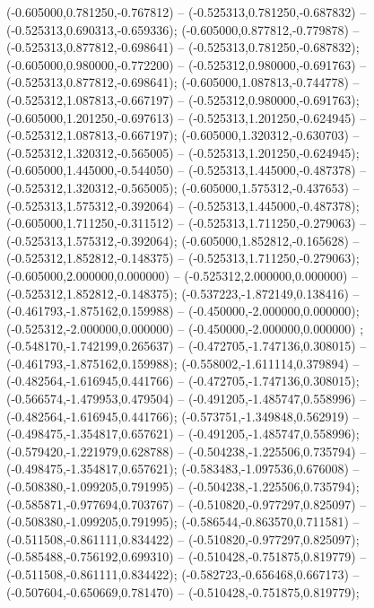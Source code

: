  (-0.605000,0.781250,-0.767812) -- (-0.525313,0.781250,-0.687832) -- (-0.525313,0.690313,-0.659336);
 (-0.605000,0.877812,-0.779878) -- (-0.525313,0.877812,-0.698641) -- (-0.525313,0.781250,-0.687832);
 (-0.605000,0.980000,-0.772200) -- (-0.525312,0.980000,-0.691763) -- (-0.525313,0.877812,-0.698641);
 (-0.605000,1.087813,-0.744778) -- (-0.525312,1.087813,-0.667197) -- (-0.525312,0.980000,-0.691763);
 (-0.605000,1.201250,-0.697613) -- (-0.525313,1.201250,-0.624945) -- (-0.525312,1.087813,-0.667197);
 (-0.605000,1.320312,-0.630703) -- (-0.525312,1.320312,-0.565005) -- (-0.525313,1.201250,-0.624945);
 (-0.605000,1.445000,-0.544050) -- (-0.525313,1.445000,-0.487378) -- (-0.525312,1.320312,-0.565005);
 (-0.605000,1.575312,-0.437653) -- (-0.525313,1.575312,-0.392064) -- (-0.525313,1.445000,-0.487378);
 (-0.605000,1.711250,-0.311512) -- (-0.525313,1.711250,-0.279063) -- (-0.525313,1.575312,-0.392064);
 (-0.605000,1.852812,-0.165628) -- (-0.525312,1.852812,-0.148375) -- (-0.525313,1.711250,-0.279063);
 (-0.605000,2.000000,0.000000) -- (-0.525312,2.000000,0.000000) -- (-0.525312,1.852812,-0.148375);
 (-0.537223,-1.872149,0.138416) -- (-0.461793,-1.875162,0.159988) -- (-0.450000,-2.000000,0.000000);
 (-0.525312,-2.000000,0.000000) -- (-0.450000,-2.000000,0.000000) ;
 (-0.548170,-1.742199,0.265637) -- (-0.472705,-1.747136,0.308015) -- (-0.461793,-1.875162,0.159988);
 (-0.558002,-1.611114,0.379894) -- (-0.482564,-1.616945,0.441766) -- (-0.472705,-1.747136,0.308015);
 (-0.566574,-1.479953,0.479504) -- (-0.491205,-1.485747,0.558996) -- (-0.482564,-1.616945,0.441766);
 (-0.573751,-1.349848,0.562919) -- (-0.498475,-1.354817,0.657621) -- (-0.491205,-1.485747,0.558996);
 (-0.579420,-1.221979,0.628788) -- (-0.504238,-1.225506,0.735794) -- (-0.498475,-1.354817,0.657621);
 (-0.583483,-1.097536,0.676008) -- (-0.508380,-1.099205,0.791995) -- (-0.504238,-1.225506,0.735794);
 (-0.585871,-0.977694,0.703767) -- (-0.510820,-0.977297,0.825097) -- (-0.508380,-1.099205,0.791995);
 (-0.586544,-0.863570,0.711581) -- (-0.511508,-0.861111,0.834422) -- (-0.510820,-0.977297,0.825097);
 (-0.585488,-0.756192,0.699310) -- (-0.510428,-0.751875,0.819779) -- (-0.511508,-0.861111,0.834422);
 (-0.582723,-0.656468,0.667173) -- (-0.507604,-0.650669,0.781470) -- (-0.510428,-0.751875,0.819779);
